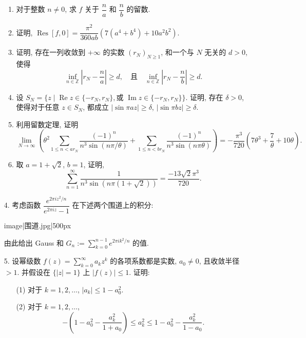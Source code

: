 \begin{itemize}
\begin{enumerate}[label=(\arabic*)]
    \item 对于整数 $n \neq 0$, 求 $f$ 关于 $\dfrac{n}{a}$ 和 $\dfrac{n}{b}$ 的留数.
    \item 证明, $\operatorname{Res}[f, 0] = \dfrac{\pi^2}{360ab}(7(a^4 + b^4) + 10a^2b^2)$.
    \item 证明, 存在一列收敛到 $+\infty$ 的实数 $(r_N)_{N \geqslant 1}$, 和一个与 $N$ 无关的 $d > 0$, 使得
    \[ \inf_{n \in \mathbb{Z}} \left| r_N - \frac{n}{a} \right| \geqslant d, \quad \text{且} \quad \inf_{n \in \mathbb{Z}} \left| r_N - \frac{n}{b} \right| \geqslant d. \]
    \item 设 $S_N = \{z \mid \operatorname{Re} z \in \{-r_N, r_N\}, \text{或 } \operatorname{Im} z \in \{-r_N, r_N\}\}$. 
    证明, 存在 $\delta > 0$, 使得对于任意 $z \in S_N$, 都成立 $| \sin \pi az | \geqslant \delta$, $| \sin \pi bz | \geqslant \delta$.
    \item 利用留数定理, 证明
    \[ \lim_{N \to \infty} \left( \theta^2 \sum_{1 \leqslant n < ar_N} \frac{(-1)^n}{n^3 \sin(n\pi/\theta)} + \sum_{1 \leqslant n < br_N} \frac{(-1)^n}{n^3 \sin(n\pi\theta)} \right) = -\frac{\pi^3}{720} \left( 7\theta^3 + \frac{7}{\theta} + 10\theta \right). \]
    \item 取 $a = 1 + \sqrt{2}$, $b = 1$, 证明,
    \[ \sum_{n=1}^\infty \frac{1}{n^3 \sin(n\pi(1 + \sqrt{2}))} = \frac{-13\sqrt{2}\pi^3}{720}. \]
\end{enumerate}

\item[4.] 考虑函数 $\dfrac{e^{2\pi i z^2/n}}{e^{2\pi i z} - 1}$ 在下述两个围道上的积分:
\begin{center}
{{image|围道.jpg|500px}}
\end{center}
由此给出 Gauss 和 $G_n := \sum_{k=0}^{n-1} e^{2\pi i k^2/n}$ 的值.
\item[5.] 设幂级数 $f(z) = \sum_{k=0}^\infty a_k z^k$ 的各项系数都是实数, $a_0 \neq 0$, 且收敛半径 $> 1$. 并假设在 $\{|z| = 1\}$ 上 $|f(z)| \leqslant 1$. 证明:
\begin{enumerate}
    \item[(1)] 对于 $k = 1, 2, \ldots$, $|a_k| \leqslant 1 - a_0^2$.
    \item[(2)] 对于 $k = 1, 2, \ldots$, 
    \[ -\left(1 - a_0^2 - \frac{a_k^2}{1 + a_0}\right) \leqslant a_k^2 \leqslant 1 - a_0^2 - \frac{a_k^2}{1 - a_0}. \]
\end{enumerate}


\end{itemize}
